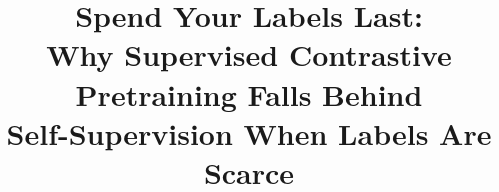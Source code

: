 \title{Spend Your Labels Last:\\Why Supervised Contrastive Pretraining Falls Behind\\Self-Supervision When Labels Are Scarce}
